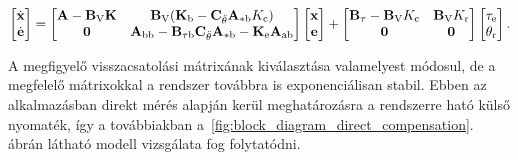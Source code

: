 \begin{align}
    \begin{bmatrix}
        \dot{\mathbf{x}} \\
        \dot{\mathbf{e}}
    \end{bmatrix}
    =
    \begin{bmatrix}
        \mathbf{A} - \mathbf{B}_{\mathrm{V}} \mathbf{K} & \mathbf{B}_{\mathrm{V}} (\mathbf{K}_{\mathrm{b}} - \mathbf{C}_{\ddot\theta} \mathbf{A}_{\mathrm{*b}} K_{\mathrm{c}}) \\
        \mathbf{0} & \mathbf{A}_{\mathrm{bb}} - \mathbf{B}_{\mathrm{\tau b}} \mathbf{C}_{\ddot\theta} \mathbf{A}_{\mathrm{*b}} - \mathbf{K}_{\mathrm{e}} \mathbf{A}_{\mathrm{ab}}
    \end{bmatrix}
    \begin{bmatrix}
        \mathbf{x} \\
        \mathbf{e}
    \end{bmatrix}
    +
    \begin{bmatrix}
        \mathbf{B}_{\mathrm{\tau}} - \mathbf{B}_{\mathrm{V}} K_{\mathrm{c}} & \mathbf{B}_{\mathrm{V}} K_{\mathrm{r}}\\
        \mathbf{0} & \mathbf{0}
    \end{bmatrix}
    \begin{bmatrix}
        \tau_{\mathrm{e}} \\
        \theta_{\mathrm{r}}
    \end{bmatrix}.
\end{align}

A megfigyelő visszacsatolási mátrixának kiválasztása valamelyest módosul, de a megfelelő mátrixokkal
a rendszer továbbra is exponenciálisan stabil. Ebben az alkalmazásban direkt mérés alapján kerül meghatározásra
a rendszerre ható külső nyomaték, így a továbbiakban a~\ref{fig:block_diagram_direct_compensation}. ábrán
látható modell vizsgálata fog folytatódni.

